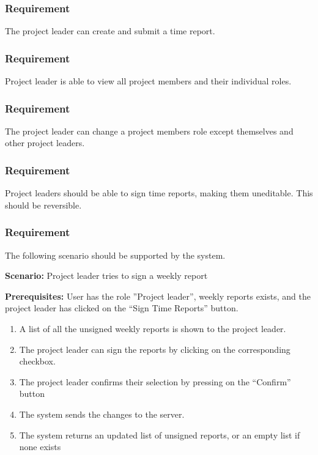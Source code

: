 \documentclass{article}
\begin{document}
\subsubsection{Requirement}
The project leader can create and submit a time report.

\subsubsection{Requirement}
Project leader is able to view all project members and their individual roles.


\subsubsection{Requirement}
The project leader can change a project members role except themselves and other project leaders.

\subsubsection{Requirement}
Project leaders should be able to sign time reports, making them uneditable. This should be reversible.

\subsubsection{Requirement}
The following scenario should be supported by the system.

\textbf{Scenario:} Project leader tries to sign a weekly report

\textbf{Prerequisites:} User has the role ”Project leader”, weekly reports exists, and the project leader has clicked on the “Sign Time Reports” button.

\begin{enumerate}
    \item A list of all the unsigned weekly reports is shown to the project leader.
    \item The project leader can sign the reports by clicking on the corresponding checkbox.
    \item The project leader confirms their selection by pressing on the “Confirm” button
    \item The system sends the changes to the server.
    \item The system returns an updated list of unsigned reports, or an empty list if none exists
\end{enumerate}
\end{document}
